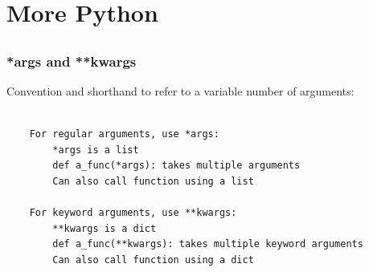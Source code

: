 \documentclass[table,dvipsnames]{beamer}
\begin{document}

\section{More Python}
\subsection{}

\begin{frame}[fragile]
\scriptsize

\frametitle{*args and **kwargs}
Convention and shorthand to refer to a variable number of arguments:
\begin{verbatim}

    For regular arguments, use *args:
        *args is a list
        def a_func(*args): takes multiple arguments
        Can also call function using a list

    For keyword arguments, use **kwargs:
        **kwargs is a dict
        def a_func(**kwargs): takes multiple keyword arguments
        Can also call function using a dict
\end{verbatim}
\end{frame}
\end{document}
